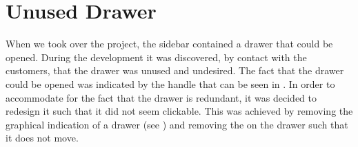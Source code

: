 
\section{Unused Drawer}
\label{sec:unused_drawer}

When we took over the \launcher project, the sidebar contained a drawer that could be opened. During the development it was discovered, by contact with the customers, that the drawer was unused and undesired. The fact that the drawer could be opened was indicated by the handle that can be seen in . In order to accommodate for the fact that the drawer is redundant, it was decided to redesign it such that it did not seem clickable. This was achieved by removing the graphical indication of a drawer (see ) and removing the  on the drawer such that it does not move.  